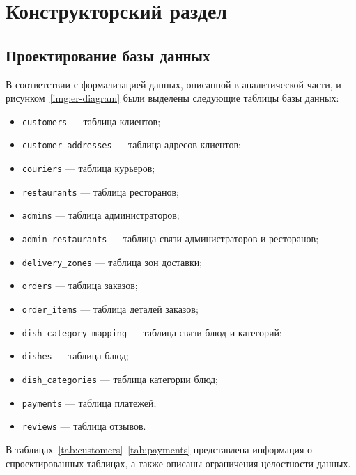 \section{Конструкторский раздел}

\subsection{Проектирование базы данных}
В соответствии с формализацией данных, описанной в аналитической части, и рисунком~\ref{img:er-diagram} были выделены следующие таблицы базы данных:
\begin{itemize}
    \item \texttt{customers} --- таблица клиентов;
    \item \texttt{customer\_addresses} --- таблица адресов клиентов;
    \item \texttt{couriers} --- таблица курьеров;
    \item \texttt{restaurants} --- таблица ресторанов;
    \item \texttt{admins} --- таблица администраторов;
    \item \texttt{admin\_restaurants} --- таблица связи администраторов и ресторанов;
    \item \texttt{delivery\_zones} --- таблица зон доставки;
    \item \texttt{orders} --- таблица заказов;
    \item \texttt{order\_items} --- таблица деталей заказов;
    \item \texttt{dish\_category\_mapping} --- таблица связи блюд и категорий;
    \item \texttt{dishes} --- таблица блюд;
    \item \texttt{dish\_categories} --- таблица категории блюд;
    \item \texttt{payments} --- таблица платежей;
    \item \texttt{reviews} --- таблица отзывов.
\end{itemize}

В таблицах~\ref{tab:customers}--\ref{tab:payments} представлена информация о спроектированных таблицах, а также описаны ограничения целостности данных.

